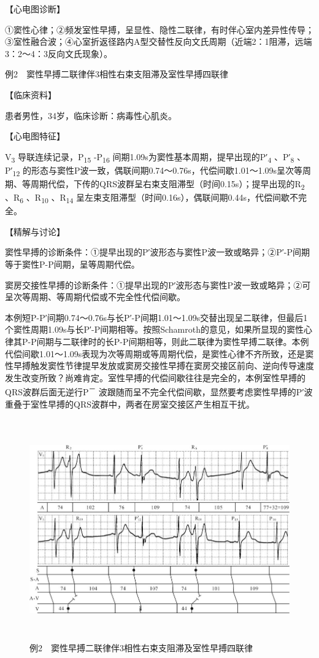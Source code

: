 【心电图诊断】

①窦性心律；②频发室性早搏，呈显性、隐性二联律，有时伴心室内差异性传导；③室性融合波；④心室折返径路内A型交替性反向文氏周期（近端2：1阻滞，远端3：2～4：3反向文氏现象）。

例2　窦性早搏二联律伴3相性右束支阻滞及室性早搏四联律

【临床资料】

患者男性，34岁，临床诊断：病毒性心肌炎。

【心电图特征】

V\textsubscript{3} 导联连续记录，P\textsubscript{15}
-P\textsubscript{16}
间期1.09s为窦性基本周期，提早出现的P′\textsubscript{4}
、P′\textsubscript{8} 、P′\textsubscript{12}
的形态与窦性P波一致，偶联间期0.74～0.76s，代偿间歇1.01～1.09s呈次等周期、等周期代偿，下传的QRS波群呈右束支阻滞型（时间0.15s）；提早出现的R\textsubscript{2}
、R\textsubscript{6} 、R\textsubscript{10} 、R\textsubscript{14}
呈左束支阻滞型（时间0.16s），偶联间期0.44s，代偿间歇不完全。

【精解与讨论】

窦性早搏的诊断条件：①提早出现的P′波形态与窦性P波一致或略异；②P′-P间期等于窦性P-P间期，呈等周期代偿。

窦房交接性早搏的诊断条件：①提早出现的P′波形态与窦性P波一致或略异；②可呈次等周期、等周期代偿或不完全性代偿间歇。

本例短P-P′间期0.74～0.76s与长P′-P间期1.01～1.09s交替出现呈二联律，但最后1个窦性周期1.09s与长P′-P间期相等。按照Schamroth的意见，如果所显现的窦性心律其P-P间期与二联律时的长P-P间期相等，则此二联律为窦性早搏二联律。本例代偿间歇1.01～1.09s表现为次等周期或等周期代偿，是窦性心律不齐所致，还是窦性早搏触发窦性节律提早发放或窦房交接性早搏在窦房交接区前向、逆向传导速度发生改变所致？尚难肯定。室性早搏的代偿间歇往往是完全的，本例室性早搏的QRS波群后面无逆行P\textsuperscript{－}
波跟随而呈不完全代偿间歇，显然要考虑窦性早搏的P′波重叠于室性早搏的QRS波群中，两者在房室交接区产生相互干扰。

\begin{figure}[!htbp]
 \centering
 \includegraphics[width=5.79167in,height=3.73958in]{./images/Image00760.jpg}
 \captionsetup{justification=centering}
 \caption{例2　窦性早搏二联律伴3相性右束支阻滞及室性早搏四联律}
 \label{fig50-2}
  \end{figure} 

